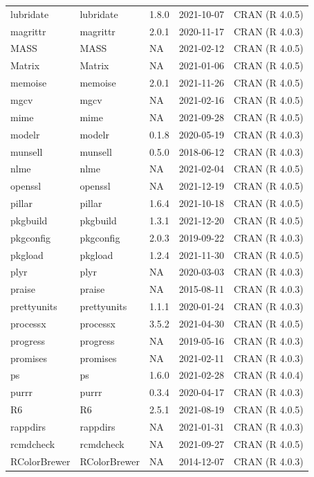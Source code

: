 \begin{tabular}{lllll}
lubridate & lubridate & 1.8.0 & 2021-10-07 & CRAN (R 4.0.5)\\
\addlinespace
magrittr & magrittr & 2.0.1 & 2020-11-17 & CRAN (R 4.0.3)\\
MASS & MASS & NA & 2021-02-12 & CRAN (R 4.0.5)\\
Matrix & Matrix & NA & 2021-01-06 & CRAN (R 4.0.5)\\
memoise & memoise & 2.0.1 & 2021-11-26 & CRAN (R 4.0.5)\\
mgcv & mgcv & NA & 2021-02-16 & CRAN (R 4.0.5)\\
\addlinespace
mime & mime & NA & 2021-09-28 & CRAN (R 4.0.5)\\
modelr & modelr & 0.1.8 & 2020-05-19 & CRAN (R 4.0.3)\\
munsell & munsell & 0.5.0 & 2018-06-12 & CRAN (R 4.0.3)\\
nlme & nlme & NA & 2021-02-04 & CRAN (R 4.0.5)\\
openssl & openssl & NA & 2021-12-19 & CRAN (R 4.0.5)\\
\addlinespace
pillar & pillar & 1.6.4 & 2021-10-18 & CRAN (R 4.0.5)\\
pkgbuild & pkgbuild & 1.3.1 & 2021-12-20 & CRAN (R 4.0.5)\\
pkgconfig & pkgconfig & 2.0.3 & 2019-09-22 & CRAN (R 4.0.3)\\
pkgload & pkgload & 1.2.4 & 2021-11-30 & CRAN (R 4.0.5)\\
plyr & plyr & NA & 2020-03-03 & CRAN (R 4.0.3)\\
\addlinespace
praise & praise & NA & 2015-08-11 & CRAN (R 4.0.3)\\
prettyunits & prettyunits & 1.1.1 & 2020-01-24 & CRAN (R 4.0.3)\\
processx & processx & 3.5.2 & 2021-04-30 & CRAN (R 4.0.5)\\
progress & progress & NA & 2019-05-16 & CRAN (R 4.0.3)\\
promises & promises & NA & 2021-02-11 & CRAN (R 4.0.3)\\
\addlinespace
ps & ps & 1.6.0 & 2021-02-28 & CRAN (R 4.0.4)\\
purrr & purrr & 0.3.4 & 2020-04-17 & CRAN (R 4.0.3)\\
R6 & R6 & 2.5.1 & 2021-08-19 & CRAN (R 4.0.5)\\
rappdirs & rappdirs & NA & 2021-01-31 & CRAN (R 4.0.3)\\
rcmdcheck & rcmdcheck & NA & 2021-09-27 & CRAN (R 4.0.5)\\
\addlinespace
RColorBrewer & RColorBrewer & NA & 2014-12-07 & CRAN (R 4.0.3)\\

\end{tabular}
